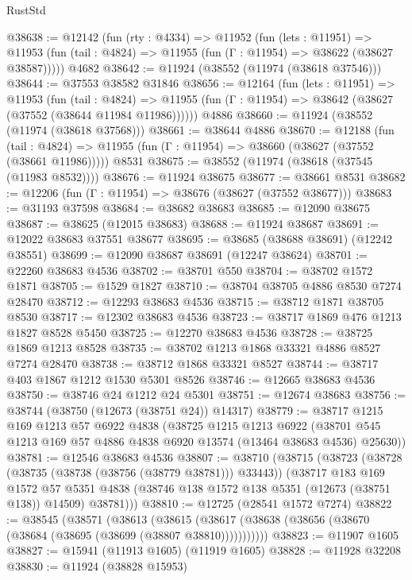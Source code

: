 \begin{lexlean}{RustStd}
\begin{coremodule}
{\begin{coremodule}
{{{{{{{{{{{{{{{{{{{{{{{{{{{{{{{{{{{{{{{{{{{{{{{{{{{{{{{{{{{{{{{{{{{{{{{{{{{{{{{{@38638 := @12142
    (fun (rty : @4334) =>
    @11952
      (fun (lets : @11951) =>
      @11953 (fun (tail : @4824) => @11955 (fun (Γ : @11954) => @38622 (@38627 @38587)))))
    @4682
@38642 := @11924 (@38552 (@11974 (@38618 @37546)))
@38644 := @37553 @38582 @31846
@38656 := @12164
    (fun (lets : @11951) =>
    @11953
      (fun (tail : @4824) =>
      @11955 (fun (Γ : @11954) => @38642 (@38627 (@37552 (@38644 @11984 @11986))))))
    @4886
@38660 := @11924 (@38552 (@11974 (@38618 @37568)))
@38661 := @38644 @4886
@38670 := @12188
    (fun (tail : @4824) => @11955 (fun (Γ : @11954) => @38660 (@38627 (@37552 (@38661 @11986)))))
    @8531
@38675 := @38552 (@11974 (@38618 (@37545 (@11983 @8532))))
@38676 := @11924 @38675
@38677 := @38661 @8531
@38682 := @12206 (fun (Γ : @11954) => @38676 (@38627 (@37552 @38677)))
@38683 := @31193 @37598
@38684 := @38682 @38683
@38685 := @12090 @38675
@38687 := @38625 (@12015 @38683)
@38688 := @11924 @38687
@38691 := @12022 @38683 @37551 @38677
@38695 := @38685 (@38688 @38691) (@12242 @38551)
@38699 := @12090 @38687 @38691 (@12247 @38624)
@38701 := @22260 @38683 @4536
@38702 := @38701 @550
@38704 := @38702 @1572 @1871
@38705 := @1529 @1827
@38710 := @38704 @38705 @4886 @8530 @7274 @28470
@38712 := @12293 @38683 @4536
@38715 := @38712 @1871 @38705 @8530
@38717 := @12302 @38683 @4536
@38723 := @38717 @1869 @476 @1213 @1827 @8528 @5450
@38725 := @12270 @38683 @4536
@38728 := @38725 @1869 @1213 @8528
@38735 := @38702 @1213 @1868 @33321 @4886 @8527 @7274 @28470
@38738 := @38712 @1868 @33321 @8527
@38744 := @38717 @403 @1867 @1212 @1530 @5301 @8526
@38746 := @12665 @38683 @4536
@38750 := @38746 @24 @1212 @24 @5301
@38751 := @12674 @38683
@38756 := @38744 (@38750 (@12673 (@38751 @24)) @14317)
@38779 := @38717
    @1215
    @169
    @1213
    @57
    @6922
    @4838
    (@38725
      @1215
      @1213
      @6922
      (@38701 @545 @1213 @169 @57 @4886 @4838 @6920 @13574 (@13464 @38683 @4536) @25630))
@38781 := @12546 @38683 @4536
@38807 := @38710
    (@38715
      (@38723
        (@38728 (@38735 (@38738 (@38756 (@38779 @38781))) @33443))
        (@38717
          @183
          @169
          @1572
          @57
          @5351
          @4838
          (@38746 @138 @1572 @138 @5351 (@12673 (@38751 @138)) @14509)
          @38781)))
@38810 := @12725 (@28541 @1572 @7274)
@38822 := @38545
    (@38571
      (@38613
        (@38615 (@38617 (@38638 (@38656 (@38670 (@38684 (@38695 (@38699 (@38807 @38810)))))))))))
@38823 := @11907 @1605
@38827 := @15941 (@11913 @1605) (@11919 @1605)
@38828 := @11928 @32208
@38830 := @11924 (@38828 @15953)
}}}}}}}}}}}}}}}}}}}}}}}}}}}}}}}}}}}}}}}}}}}}}}}}}}}}}}}}}}}}}}}}}}}}}}}}}}}}}}}}
\end{coremodule}}
\end{coremodule}
\end{lexlean}
